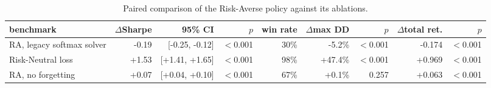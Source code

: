 \begin{table}[ht!]
\centering
\footnotesize
\setlength{\tabcolsep}{4pt}
\begin{tabular}{lrrrrrrrr}
\hline
benchmark & $\Delta$Sharpe & 95\% CI & $p$ & win rate & $\Delta$max DD & $p$ & $\Delta$total ret. & $p$ \\
\hline
RA, legacy softmax solver & -0.19 & [-0.25, -0.12] & $<$0.001 & 30\% & -5.2\% & $<$0.001 & -0.174 & $<$0.001 \\
Risk-Neutral loss & +1.53 & [+1.41, +1.65] & $<$0.001 & 98\% & +47.4\% & $<$0.001 & +0.969 & $<$0.001 \\
RA, no forgetting & +0.07 & [+0.04, +0.10] & $<$0.001 & 67\% & +0.1\% & 0.257 & +0.063 & $<$0.001 \\
\hline
\end{tabular}
\caption{Paired comparison of the Risk-Averse policy against its ablations.}
\label{tab:ablation_paired_bear2022}
\end{table}
